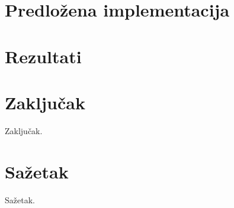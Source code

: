 \documentclass[times, utf8, seminar, numeric]{fer}
\begin{document}
\chapter{Predložena implementacija}

\chapter{Rezultati}

\chapter{Zaključak}
Zaključak.




\chapter{Sažetak}
Sažetak.
\end{document}
